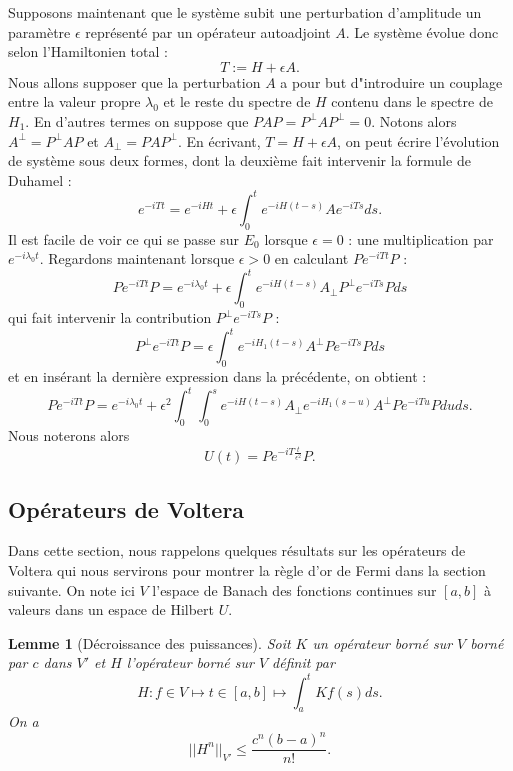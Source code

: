 \documentclass[12pt,openany,a4paper, titlepage]{article}
\newcommand{\f}[2]{\frac{#1}{#2}}
\newcommand{\St}[2]{e^{-i #1 #2}}
\newcommand{\ortho}{P^\perp}
\newtheorem{lem}{Lemme}
\theoremstyle{definition}
\theoremstyle{definition}
\theoremstyle{definition}
\theoremstyle{definition}
\theoremstyle{definition}
\theoremstyle{definition}
\begin{document}
Supposons maintenant que le système subit une perturbation d'amplitude un paramètre $\epsilon$ représenté par un opérateur autoadjoint $A$. Le système évolue donc selon l'Hamiltonien total :
$$ T := H + \epsilon A.$$
Nous allons supposer que la perturbation $A$ a pour but d"introduire un couplage entre la valeur propre $\lambda_0$ et le reste du spectre de $H$ contenu dans le spectre de $H_1$. En d'autres termes on suppose que $PAP = \ortho A \ortho = 0$. Notons alors $A^\perp = \ortho A P$ et $A_\perp = P A \ortho$.
En écrivant, $T = H + \epsilon A$, on peut écrire l'évolution de système sous deux formes, dont la deuxième fait intervenir la formule de Duhamel :
$$ \St{T}{t} = \St{H}{t} + \epsilon\int_0^t \St{H}{(t-s)}A\St{T}{s}  ds.$$
Il est facile de voir ce qui se passe sur $E_0$ lorsque $\epsilon = 0$ : une multiplication par $\St{\lambda_0}{t}$. Regardons maintenant lorsque $\epsilon > 0$ en calculant $P\St{T}{t}P$ :
$$ P\St{T}{t}P = \St{\lambda_0}{t} + \epsilon\int_0^t \St{H}{(t-s)}A_\perp \ortho\St{T}{s}P  ds$$
qui fait intervenir la contribution $\ortho\St{T}{s}P$ : 
$$ \ortho\St{T}{t}P = \epsilon\int_0^t \St{H_1}{(t-s)}A^\perp P\St{T}{s}P  ds$$
et en insérant la dernière expression dans la précédente, on obtient :
$$ P\St{T}{t}P = \St{\lambda_0}{t} + \epsilon^2\int_0^t\int_0^s \St{H}{(t-s)}A_\perp \St{H_1}{(s-u)}A^\perp P\St{T}{u}P  duds.$$
Nous noterons alors $$U(t) = P\St{T}{\f{t}{\epsilon^2}}P.$$

\subsection{Opérateurs de Voltera}

Dans cette section, nous rappelons quelques résultats sur les opérateurs de Voltera qui nous servirons pour montrer la règle d'or de Fermi dans la section suivante. On note ici $V$ l'espace de Banach des fonctions continues sur $[a,b]$ à valeurs dans un espace de Hilbert $U$.

\begin{lem}[Décroissance des puissances]
Soit $K$ un opérateur borné sur $V$ borné par $c$ dans $V'$ et $H$ l'opérateur borné sur $V$ définit par 
$$H :f\in V \mapsto t\in[a,b] \mapsto \int_a^t Kf(s)ds.$$
On a 
\begin{equation}
    ||H^n||_{V'} \leq \f{c^n(b-a)^n}{n!}.
\end{equation}
\end{lem}
\end{document}
